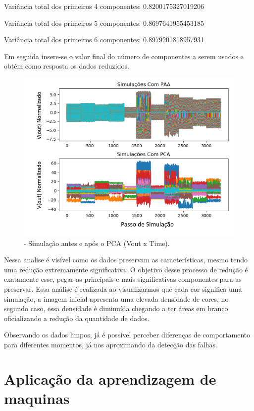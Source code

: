 Variância total dos primeiros 4 componentes: 0.8200175327019206

Variância total dos primeiros 5 componentes: 0.8697641955453185

Variância total dos primeiros 6 componentes: 0.8979201818957931

Em seguida insere-se o valor final do número de componentes a serem usados e obtém como resposta os dados reduzidos. 

\begin{figure}[H]
\begin{center}
\includegraphics[width=15cm]{./04_Cap4/figures/reducaoPCA.png}
\caption{\label{fig:PCAreducao}- Simulação antes e após o PCA (Vout x Time).}
\end{center}
\end{figure}

Nessa analise é visível como os dados preservam as características, mesmo tendo uma  redução extremamente significativa. O objetivo desse processo de redução é exatamente esse, pegar as principais e mais significativas componentes para as preservar. Essa análise é realizada ao visualizarmos que cada cor significa uma  simulação, a imagem inicial apresenta uma elevada densidade de cores, no segundo caso, essa densidade é diminuída chegando a ter áreas em branco oficializando a redução da quantidade de dados. 

Observando os dados limpos, já é possível perceber diferenças de comportamento para diferentes momentos, já nos aproximando da detecção das falhas. 


\section{\textbf{Aplicação da aprendizagem de maquinas}}

